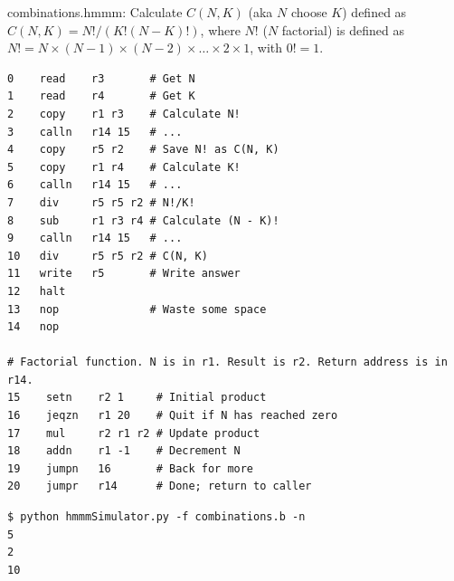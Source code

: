 \documentclass[8pt,a4paper,compress]{beamer}
\begin{document}
\begin{frame}[fragile]
\pause

\begin{framed}
\tiny combinations.hmmm: Calculate $C(N, K)$ (aka $N$ choose $K$) defined as $C(N, K)=N!/(K!(N-K)!)$, where $N!$ ($N$ factorial) is defined as $N! = N \times (N-1) \times (N-2) \times \dots \times 2 \times 1$, with $0! = 1$.
\end{framed}

\begin{lstlisting}[language={}]
0    read    r3       # Get N
1    read    r4       # Get K
2    copy    r1 r3    # Calculate N!
3    calln   r14 15   # ...
4    copy    r5 r2    # Save N! as C(N, K)
5    copy    r1 r4    # Calculate K!
6    calln   r14 15   # ...
7    div     r5 r5 r2 # N!/K!
8    sub     r1 r3 r4 # Calculate (N - K)!
9    calln   r14 15   # ...
10   div     r5 r5 r2 # C(N, K)
11   write   r5       # Write answer
12   halt
13   nop              # Waste some space
14   nop

# Factorial function. N is in r1. Result is r2. Return address is in r14.
15    setn    r2 1     # Initial product
16    jeqzn   r1 20    # Quit if N has reached zero
17    mul     r2 r1 r2 # Update product
18    addn    r1 -1    # Decrement N
19    jumpn   16       # Back for more
20    jumpr   r14      # Done; return to caller
\end{lstlisting}

\pause

\begin{lstlisting}[language={}]
$ python hmmmSimulator.py -f combinations.b -n
5
2
10
\end{lstlisting}
\end{frame}
\end{document}
